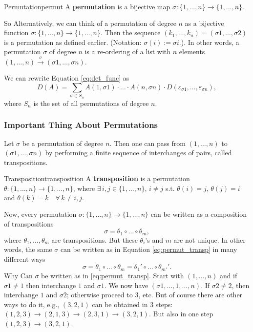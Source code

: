 \begin{definition}{Permutation}{permut}
	A \textbf{permutation} is a bijective map $\sigma :\{1, \hdots, n\} \to \{1, \hdots, n\}$.
\end{definition}

So Alternatively, we can think of a permutation of degree $n$ as a bijective function $\sigma:\{1,\hdots , n\} \to \{1, \hdots , n\}$. Then the sequence $(k_1, \hdots, k_n) = (\sigma 1, \hdots, \sigma 2)$ is a permutation as defined earlier. (Notation: $\sigma(i) := \sigma i$.). In other words, a permutation $\sigma$ of degree $n$ is a re-ordering of a list with $n$ elements $(1,\hdots, n) \overset{\sigma}{\longrightarrow} (\sigma 1, \hdots, \sigma n)$.

We can rewrite Equation \eqref{eq:det_func} as
\[
	D(A) = \sum_{\sigma \in S_n} A(1, \sigma 1)\cdot \hdots \cdot A(n, \sigma n) \cdot D(\varepsilon_{\sigma 1}, \hdots , \varepsilon_{\sigma n}),
\]
where $S_n$ is the set of all permutations of degree $n$.

\subsubsection{Important Thing About Permutations}
Let $\sigma$ be a permutation of degree $n$. Then one can pass from $(1, \hdots , n)$ to $(\sigma 1, \hdots , \sigma n)$ by performing a finite sequence of interchanges of pairs, called transpositions.

\begin{definition}{Transposition}{transposition}
	A \textbf{transposition} is a permutation $\theta :\{1, \hdots, n\} \to \{1, \hdots, n\}$, where $\exists \, i,j \in \{1, \hdots, n\}$, $i \neq j$ s.t. $\theta(i) = j$,  $\theta(j) = i$ and $\theta(k) = k \quad \forall \, k\neq i,j$.
\end{definition}

Now, every permutation $\sigma :\{1, \hdots, n\} \to \{1, \hdots, n\}$ can be written as a composition of transpositions
\begin{equation}
	\label{eq:permut_transp}
	\sigma = \theta_1 \circ \hdots \circ \theta_m,
\end{equation}
where $\theta_1, \hdots, \theta_m$ are transpositions. But these $\theta_i$'s and $m$ are not unique. In other words, the same $\sigma$ can be written as in Equation \eqref{eq:permut_transp} in many different ways
\[
	\sigma = \theta_1 \circ \hdots \circ \theta_m = \theta_1' \circ \hdots \circ \theta_{m'}'.
\]
Why Can $\sigma$ be written as in \eqref{eq:permut_transp}. Start with $(1, \hdots , n)$ and if $\sigma 1 \neq 1$ then interchange $1$ and $\sigma 1$. We now have $(\sigma 1, \hdots , 1, \hdots , n)$. If $\sigma 2 \neq 2$, then interchange $1 $ and $\sigma 2$; otherwise proceed to $3$, etc. But of course there are other ways to do it, e.g., $(3, 2, 1)$ can be obtained in 3 steps: $(1,2,3) \to (2,1,3) \to (2,3,1) \to (3,2,1)$. But also in one step $(1,2,3) \to (3,2,1)$.

